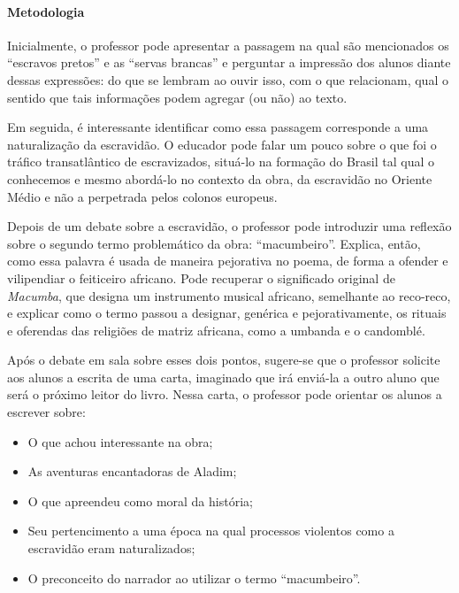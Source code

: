 \documentclass[11pt]{extarticle}
\begin{document}
\paragraph{Metodologia} Inicialmente, o professor pode apresentar a passagem na qual são mencionados os ``escravos pretos'' e as ``servas brancas'' e perguntar a impressão dos alunos diante dessas expressões: do que se lembram ao ouvir isso, com o que relacionam, qual o sentido que tais informações podem agregar (ou não) ao texto.

Em seguida, é interessante identificar como essa passagem corresponde a uma naturalização da escravidão. O educador pode falar um pouco sobre o que foi o tráfico transatlântico de escravizados, situá-lo na formação do Brasil tal qual o conhecemos e mesmo abordá-lo no contexto da obra, da escravidão no Oriente Médio e não a perpetrada pelos colonos europeus.

Depois de um debate sobre a escravidão, o professor pode introduzir uma reflexão sobre o segundo termo problemático da obra: ``macumbeiro''. Explica, então, como essa palavra é usada de maneira pejorativa no poema, de forma a ofender e vilipendiar o feiticeiro africano. Pode recuperar o significado original de \textit{Macumba}, que designa um instrumento musical africano, semelhante ao reco-reco, e explicar como o termo passou a designar, genérica e pejorativamente, os rituais e oferendas das religiões de matriz africana, como a umbanda e o candomblé.

Após o debate em sala sobre esses dois pontos, sugere-se que o professor solicite aos alunos a escrita de uma carta, imaginado que irá enviá-la a outro aluno que será o próximo leitor do livro.
Nessa carta, o professor pode orientar os alunos a escrever sobre:

\begin{itemize}
\item O que achou interessante na obra;

\item As aventuras encantadoras de Aladim;

\item O que apreendeu como moral da história;

\item Seu pertencimento a uma época na qual processos violentos como a escravidão eram naturalizados;

\item O preconceito do narrador ao utilizar o termo ``macumbeiro''.
\end{itemize}
\end{document}
